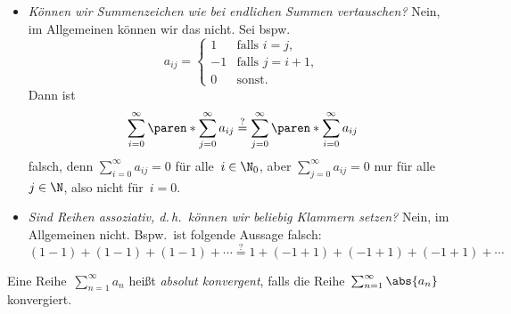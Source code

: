 \documentclass[a4paper]{article}
\begin{document}
\begin{itemize}
    \item \emph{Können wir Summenzeichen wie bei endlichen Summen vertauschen?} Nein, im Allgemeinen können wir das nicht. Sei bspw.\
          \begin{equation*}
              a_{ij} = \begin{cases}
                  1  & \text{falls } i = j,   \\
                  -1 & \text{falls } j = i+1, \\
                  0  & \text{sonst}.
              \end{cases}
          \end{equation*}
          Dann ist
          \begin{equation*}
              \sum_{i=0}^\infty \paren*{\sum_{j=0}^\infty a_{ij}} \overset{?}{=} \sum_{j=0}^\infty \paren*{\sum_{i=0}^\infty a_{ij}}
          \end{equation*}
          falsch, denn $\sum_{i=0}^\infty a_{ij} = 0$ für alle~$i \in \N_0$, aber $\sum_{j=0}^\infty a_{ij} = 0$ nur für alle~$j \in \N$, also nicht für~$i = 0$.
          \begin{center}
          \end{center}

    \item \emph{Sind Reihen assoziativ, d.\,h.\ können wir beliebig Klammern setzen?} Nein, im Allgemeinen nicht. Bspw.\ ist folgende Aussage falsch:
          \begin{equation*}
              (1-1) + (1-1) + (1-1) + \cdots \overset{?}{=} 1 + (-1+1) + (-1+1) + (-1+1) + \cdots
          \end{equation*}
\end{itemize}

\begin{definition}
    Eine Reihe~$\sum_{n=1}^\infty a_n$ heißt \emph{absolut konvergent}, falls die Reihe~$\sum_{n=1}^\infty \abs{a_n}$ konvergiert.
\end{definition}
\end{document}
